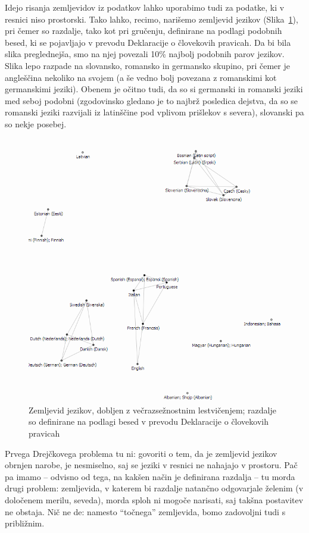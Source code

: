 Idejo risanja zemljevidov iz podatkov lahko uporabimo tudi za podatke, ki v resnici niso prostorski. Tako lahko, recimo, narišemo zemljevid jezikov (Slika~\ref{f-jeziki-mds}), pri čemer so razdalje, tako kot pri gručenju, definirane na podlagi podobnih besed, ki se pojavljajo v prevodu Deklaracije o človekovih pravicah. Da bi bila slika preglednejša, smo na njej povezali 10\% najbolj podobnih parov jezikov. Slika lepo razpade na slovansko, romansko in germansko skupino, pri čemer je angleščina nekoliko na svojem (a še vedno bolj povezana z romanskimi kot germanskimi jeziki). Obenem je očitno tudi, da so si germanski in romanski jeziki med seboj podobni (zgodovinsko gledano je to najbrž posledica dejstva, da so se romanski jeziki razvijali iz latinščine pod vplivom prišlekov s severa), slovanski pa so nekje posebej.

\begin{figure}[tbp]
\begin{center}
\includegraphics[width=12cm]{slike/jeziki-mds.png}
\caption{Zemljevid jezikov, dobljen z večrazsežnostnim lestvičenjem; razdalje so definirane na podlagi besed v prevodu Deklaracije o človekovih pravicah}
\label{f-jeziki-mds}
\end{center}
\end{figure}


Prvega Drejčkovega problema tu ni: govoriti o tem, da je zemljevid jezikov obrnjen narobe, je nesmiselno, saj se jeziki v resnici ne nahajajo v prostoru. Pač pa imamo -- odvisno od tega, na kakšen način je definirana razdalja -- tu morda drugi problem: zemljevida, v katerem bi razdalje natančno odgovarjale želenim (v določenem merilu, seveda), morda sploh ni mogoče narisati, saj takšna postavitev ne obstaja. Nič ne de: namesto ``točnega'' zemljevida, bomo zadovoljni tudi s približnim. 

